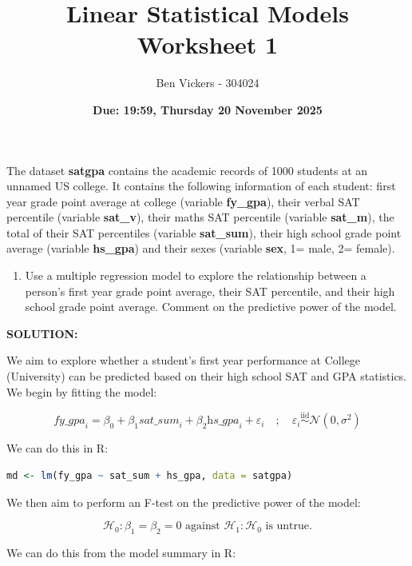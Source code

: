 \documentclass[]{article}
\title{\textbf{Linear Statistical Models Worksheet 1}}
\author{Ben Vickers - 304024}
\date{\textbf{Due: 19:59, Thursday 20 November 2025}}
\begin{document}
	\maketitle
   
\noindent The dataset \textbf{satgpa} contains the academic records of 1000 students at an unnamed US college. It contains the following information of each student: first year grade point average at college (variable \textbf{fy\_gpa}), their verbal SAT percentile (variable \textbf{sat\_v}), their maths SAT percentile (variable \textbf{sat\_m}), the total of their SAT percentiles (variable \textbf{sat\_sum}), their high school grade point average (variable \textbf{hs\_gpa}) and their sexes (variable \textbf{sex}, 1= male, 2= female).

\begin{enumerate}
\item Use a multiple regression model to explore the relationship between
a person’s first year grade point average, their SAT percentile, and their high
school grade point average. Comment on the predictive power of the model.
\end{enumerate}


\noindent \textbf{SOLUTION:}\newline

\noindent We aim to explore whether a student's first year performance at College (University) can be predicted based on their high school SAT and GPA statistics. We begin by fitting the model:

\[
\textit{fy\_gpa}_i = \beta_0 + \beta_1 \textit{sat\_sum}_i + \beta_2  \textit{hs\_gpa}_i + \varepsilon_i \quad;\quad \varepsilon_i\overset{\text{iid}}{\sim}\mathcal{N}(0,\sigma^2)
\]

\noindent We can do this in \textsf{R}:

\begin{lstlisting}[language=R]
md <- lm(fy_gpa ~ sat_sum + hs_gpa, data = satgpa)
\end{lstlisting}

\noindent We then aim to perform an F-test on the predictive power of the model:

\[
\mathcal{H}_0:\beta_1=\beta_2=0 \text{     against     }\mathcal{H}_1:\mathcal{H}_0\text{ is untrue.}
\]

\noindent We can do this from the model summary in \textsf{R}:
\end{document}
